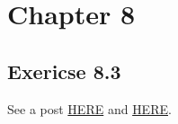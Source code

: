 \section{Chapter 8}

\subsection{Exericse 8.3}

See a post \href{https://math.stackexchange.com/questions/1848213/intersection-of-height-one-localisations-of-a-normal-noetherian-domain}{HERE} and \href{https://math.stackexchange.com/questions/1378750/domain-strictly-contained-in-the-intersection-of-localizations-at-the-primes-of}{HERE}.
